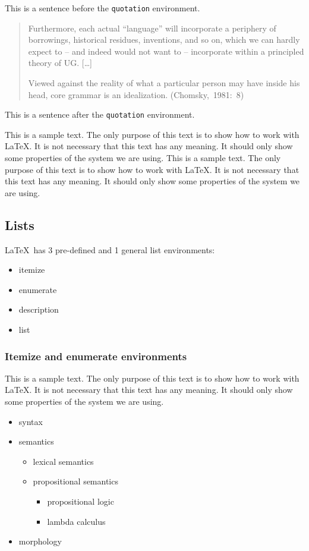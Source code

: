 \documentclass[10pt, paper=a4, abstracton]{scrartcl}
\begin{document}
This is a sentence before the \texttt{quotation} environment.
\begin{quotation}
	Furthermore, each actual ``language'' will incorporate a periphery of borrowings,
	historical residues, inventions, and so on, which we can hardly expect to -- and
	indeed would not want to -- incorporate within a principled theory of UG.  [\dots]
	
	Viewed against the reality of what a particular person may have inside
	his head, core grammar is an idealization.
	\hfill (Chomsky,~1981:~8)
\end{quotation}
This is a sentence after the \texttt{quotation} environment.


This is a sample text. The only purpose of this text is to show how to work with \LaTeX . It is not necessary that this text has any meaning. It should only show some properties of the system we are using. This is a sample text. The only purpose of this text is to show how to work with \LaTeX . It is not necessary that this text has any meaning. It should only show some properties of the system we are using. 


\subsection{Lists}

\LaTeX\ has 3 pre-defined and 1 general list environments:

\begin{itemize}
	\item itemize
	\item enumerate
	\item description
	\item list
\end{itemize}


\subsubsection{Itemize and enumerate environments}

This is a sample text. The only purpose of this text is to show how to work with \LaTeX . It is not necessary that this text has any meaning. It should only show some properties of the system we are using.

\begin{itemize}
	\item syntax
	\item semantics 
	
	\begin{itemize}
		\item lexical semantics
		\item propositional semantics
		
		\begin{itemize}
			\item propositional logic
			\item lambda calculus
		\end{itemize}
	\end{itemize}
	
	\item morphology
\end{itemize}
\end{document}
